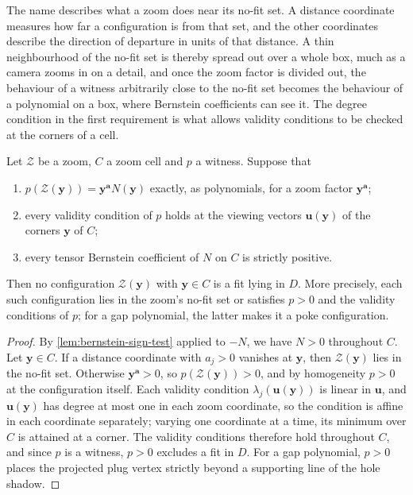 The name describes what a zoom does near its no-fit set. A distance
coordinate measures how far a configuration is from that set, and the
other coordinates describe the direction of departure in units of that
distance. A thin neighbourhood of the no-fit set is thereby spread out
over a whole box, much as a camera zooms in on a detail, and once the zoom
factor is divided out, the behaviour of a witness arbitrarily close to the
no-fit set becomes the behaviour of a polynomial on a box, where Bernstein
coefficients can see it. The degree condition in the first requirement is
what allows validity conditions to be checked at the corners of a cell.

\begin{lemma}\label{lem:zoom-lemma}
  Let $\mathcal Z$ be a zoom, $C$ a zoom cell and $p$ a witness. Suppose that
  \begin{enumerate}
    \item $p(\mathcal Z(\mathbf y))=\mathbf y^{\mathbf a}N(\mathbf y)$ exactly,
      as polynomials, for a zoom factor $\mathbf y^{\mathbf a}$;
    \item every validity condition of $p$ holds at the viewing vectors
      $\mathbf u(\mathbf y)$ of the corners $\mathbf y$ of $C$;
    \item every tensor Bernstein coefficient of $N$ on $C$ is strictly
      positive.
  \end{enumerate}
  Then no configuration $\mathcal Z(\mathbf y)$ with $\mathbf y\in C$ is a
  fit lying in $D$. More precisely, each such configuration lies in the
  zoom's no-fit set or satisfies $p>0$ and the validity conditions of $p$;
  for a gap polynomial, the latter makes it a poke configuration.
\end{lemma}
\begin{proof}
  By \cref{lem:bernstein-sign-test} applied to $-N$, we have $N>0$
  throughout $C$. Let $\mathbf y\in C$. If a distance coordinate with
  $a_j>0$ vanishes at $\mathbf y$, then $\mathcal Z(\mathbf y)$ lies in the
  no-fit set. Otherwise $\mathbf y^{\mathbf a}>0$, so
  $p(\mathcal Z(\mathbf y))>0$, and by homogeneity $p>0$ at the
  configuration itself. Each validity condition $\lambda_j(\mathbf u(\mathbf y))$
  is linear in $\mathbf u$, and $\mathbf u(\mathbf y)$ has degree at most one
  in each zoom coordinate, so the condition is affine in each coordinate
  separately; varying one coordinate at a time, its minimum over $C$ is
  attained at a corner. The validity conditions therefore hold throughout
  $C$, and since $p$ is a witness, $p>0$ excludes a fit in $D$. For a gap
  polynomial, $p>0$ places the projected plug vertex strictly beyond a
  supporting line of the hole shadow.
\end{proof}

